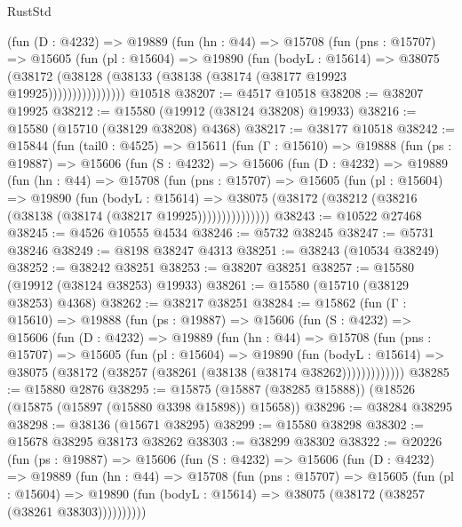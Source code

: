\begin{lexlean}{RustStd}
\begin{coremodule}
              (fun (D : @4232) =>
              @19889
                (fun (hn : @44) =>
                @15708
                  (fun (pns : @15707) =>
                  @15605
                    (fun (pl : @15604) =>
                    @19890
                      (fun (bodyL : @15614) =>
                      @38075
                        (@38172
                          (@38128 (@38133 (@38138 (@38174 (@38177 @19923 @19925))))))))))))))))
    @10518
@38207 := @4517 @10518
@38208 := @38207 @19925
@38212 := @15580 (@19912 (@38124 @38208) @19933)
@38216 := @15580 (@15710 (@38129 @38208) @4368)
@38217 := @38177 @10518
@38242 := @15844
    (fun (tail0 : @4525) =>
    @15611
      (fun (Γ : @15610) =>
      @19888
        (fun (ps : @19887) =>
        @15606
          (fun (S : @4232) =>
          @15606
            (fun (D : @4232) =>
            @19889
              (fun (hn : @44) =>
              @15708
                (fun (pns : @15707) =>
                @15605
                  (fun (pl : @15604) =>
                  @19890
                    (fun (bodyL : @15614) =>
                    @38075 (@38172 (@38212 (@38216 (@38138 (@38174 (@38217 @19925)))))))))))))))
@38243 := @10522 @27468
@38245 := @4526 @10555 @4534
@38246 := @5732 @38245
@38247 := @5731 @38246
@38249 := @8198 @38247 @4313
@38251 := @38243 (@10534 @38249)
@38252 := @38242 @38251
@38253 := @38207 @38251
@38257 := @15580 (@19912 (@38124 @38253) @19933)
@38261 := @15580 (@15710 (@38129 @38253) @4368)
@38262 := @38217 @38251
@38284 := @15862
    (fun (Γ : @15610) =>
    @19888
      (fun (ps : @19887) =>
      @15606
        (fun (S : @4232) =>
        @15606
          (fun (D : @4232) =>
          @19889
            (fun (hn : @44) =>
            @15708
              (fun (pns : @15707) =>
              @15605
                (fun (pl : @15604) =>
                @19890
                  (fun (bodyL : @15614) =>
                  @38075 (@38172 (@38257 (@38261 (@38138 (@38174 @38262)))))))))))))
@38285 := @15880 @2876
@38295 := @15875 (@15887 (@38285 @15888)) (@18526 (@15875 (@15897 (@15880 @3398 @15898)) @15658))
@38296 := @38284 @38295
@38298 := @38136 (@15671 @38295)
@38299 := @15580 @38298
@38302 := @15678 @38295 @38173 @38262
@38303 := @38299 @38302
@38322 := @20226
    (fun (ps : @19887) =>
    @15606
      (fun (S : @4232) =>
      @15606
        (fun (D : @4232) =>
        @19889
          (fun (hn : @44) =>
          @15708
            (fun (pns : @15707) =>
            @15605
              (fun (pl : @15604) =>
              @19890 (fun (bodyL : @15614) => @38075 (@38172 (@38257 (@38261 @38303))))))))))

\end{coremodule}
\end{lexlean}
